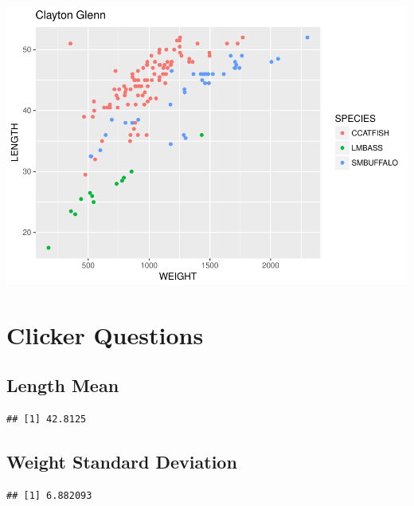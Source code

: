 \documentclass[]{article}
\newenvironment{Shaded}{\begin{snugshade}}{\end{snugshade}}
\newcommand{\KeywordTok}[1]{\textcolor[rgb]{0.13,0.29,0.53}{\textbf{#1}}}
\newcommand{\OperatorTok}[1]{\textcolor[rgb]{0.81,0.36,0.00}{\textbf{#1}}}
\newcommand{\NormalTok}[1]{#1}
\begin{document}
\includegraphics{./tex2pdf.5760/771defe5c65dfa80e0ae92735ee3d7a9218bc1fc.pdf}

\section{Clicker Questions}\label{clicker-questions}

\subsection{Length Mean}\label{length-mean}

\begin{Shaded}
\end{Shaded}

\begin{verbatim}
## [1] 42.8125
\end{verbatim}

\subsection{Weight Standard Deviation}\label{weight-standard-deviation}

\begin{Shaded}
\end{Shaded}

\begin{verbatim}
## [1] 6.882093
\end{verbatim}
\end{document}

